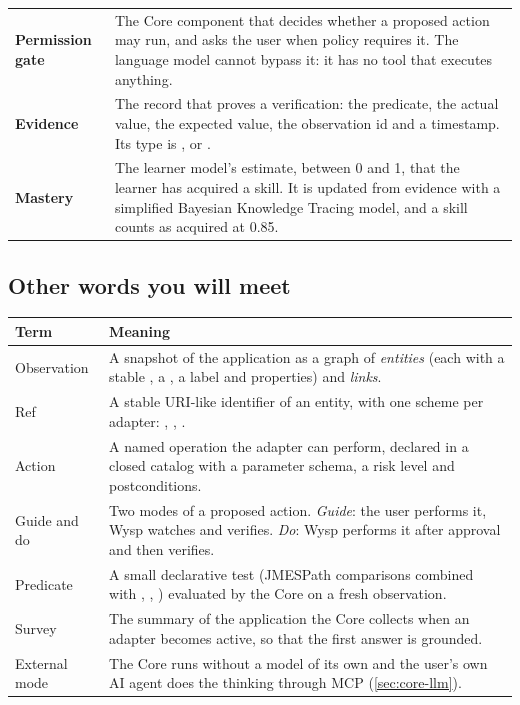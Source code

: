 \begin{xltabular}{\textwidth}{@{}L{2.6cm}Y@{}}
\textbf{Permission gate} & The Core component that decides whether a proposed action may run, and asks the user when policy requires it. The language model cannot bypass it: it has no tool that executes anything. \\
\textbf{Evidence} & The record that proves a verification: the predicate, the actual value, the expected value, the observation id and a timestamp. Its type is ,  or . \\
\textbf{Mastery} & The learner model's estimate, between 0 and 1, that the learner has acquired a skill. It is updated from evidence with a simplified Bayesian Knowledge Tracing model, and a skill counts as acquired at 0.85. \\
\bottomrule
\end{xltabular}

\subsection{Other words you will meet}

\begin{xltabular}{\textwidth}{@{}L{2.6cm}Y@{}}
\toprule
\textbf{Term} & \textbf{Meaning} \\
\midrule
Observation & A snapshot of the application as a graph of \emph{entities} (each with a stable , a , a label and properties) and \emph{links}. \\
Ref & A stable URI-like identifier of an entity, with one scheme per adapter: , , . \\
Action & A named operation the adapter can perform, declared in a closed catalog with a parameter schema, a risk level and postconditions. \\
Guide and do & Two modes of a proposed action. \emph{Guide}: the user performs it, Wysp watches and verifies. \emph{Do}: Wysp performs it after approval and then verifies. \\
Predicate & A small declarative test (JMESPath comparisons combined with , , ) evaluated by the Core on a fresh observation. \\
Survey & The summary of the application the Core collects when an adapter becomes active, so that the first answer is grounded. \\
External mode & The Core runs without a model of its own and the user's own AI agent does the thinking through MCP (\cref{sec:core-llm}). \\
\bottomrule
\end{xltabular}

